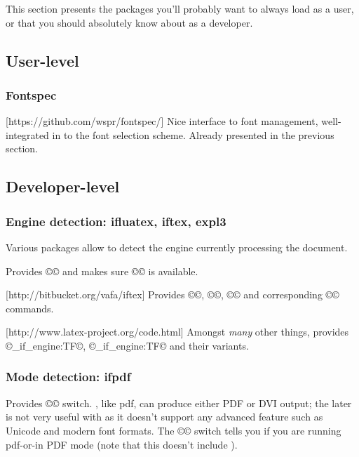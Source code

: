 \documentclass{lltxdoc}
\begin{document}
This section presents the packages you'll probably want to always load as a
user, or that you should absolutely know about as a developer.

\subsection{User-level}

\subsubsection{Fontspec}

[https://github.com/wspr/fontspec/]
Nice interface to font management, well-integrated in to the \latex font
selection scheme. Already presented in the previous section.

\subsection{Developer-level}

\subsubsection{Engine detection: ifluatex, iftex, expl3}

Various packages allow to detect the engine currently processing the document.

\medskip
{}
Provides ©\ifluatex© and makes sure ©\luatexversion© is available.

\medskip
{}[http://bitbucket.org/vafa/iftex]
Provides ©\ifPDFTeX©, ©\ifXeTeX©, ©\ifLuaTeX© and corresponding ©\Require©
commands.

\medskip
{}[http://www.latex-project.org/code.html]
Amongst \emph{many} other things, provides ©\luatex_if_engine:TF©,
©\xetex_if_engine:TF© and their variants.

\subsubsection{Mode detection: ifpdf}

Provides ©\ifpdf© switch. \luatex, like pdf\tex, can produce either PDF or DVI
output; the later is not very useful with \luatex as it doesn't support any
advanced feature such as Unicode and modern font formats. The ©\ifpdf© switch
tells you if you are running pdf\tex-or-\luatex in PDF mode (note that this
doesn't include \xetex).
\end{document}
